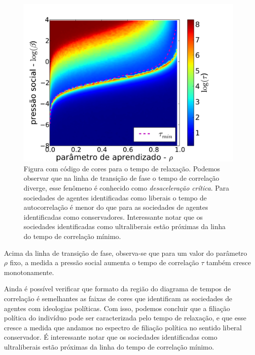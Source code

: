 \begin{figure}
    \centering
    \includegraphics[scale=0.6]{Figures/tempocor_line.pdf}
    \caption{ 
        Figura com código de cores para o tempo de relaxação. Podemos
        observar que na linha de transição de fase o tempo de correlação
        diverge, esse fenômeno é conhecido como \textit{desaceleração crítica}. 
        Para sociedades de agentes identificadas como liberais o
        tempo de autocorrelação é menor do que para as sociedades de
        agentes identificadas como conservadores. Interessante notar que
        os sociedades identificadas como ultraliberais estão próximas da
        linha do tempo de correlação mínimo.
    }
    \label{fig:fasetempo}
\end{figure}


Acima da linha de transição de fase, observa-se que para um valor do
parâmetro $\rho$ fixo, a medida a pressão social aumenta o tempo de
correlação $\tau$ também cresce monotonamente.

Ainda é possível verificar que formato da região do diagrama de tempos de
correlação é semelhantes as faixas de cores que identificam as sociedades de
agentes com ideologias políticas. Com isso, podemos concluir que a filiação
política do indivíduo pode ser caracterizada pelo tempo de relaxação, e que
esse cresce a medida que andamos no espectro de filiação política no sentido
liberal conservador. É interessante notar que os sociedades identificadas
como ultraliberais estão próximas da linha do tempo de correlação mínimo.



\newpage
